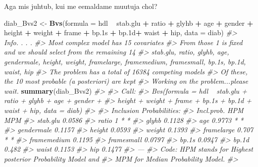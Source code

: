 \documentclass[]{book}
\newenvironment{Shaded}{\begin{snugshade}}{\end{snugshade}}
\newcommand{\KeywordTok}[1]{\textcolor[rgb]{0.13,0.29,0.53}{\textbf{#1}}}
\newcommand{\DataTypeTok}[1]{\textcolor[rgb]{0.13,0.29,0.53}{#1}}
\newcommand{\StringTok}[1]{\textcolor[rgb]{0.31,0.60,0.02}{#1}}
\newcommand{\CommentTok}[1]{\textcolor[rgb]{0.56,0.35,0.01}{\textit{#1}}}
\newcommand{\OperatorTok}[1]{\textcolor[rgb]{0.81,0.36,0.00}{\textbf{#1}}}
\newcommand{\NormalTok}[1]{#1}
\begin{document}
Aga mis juhtub, kui me eemaldame muutuja chol?

\begin{Shaded}
\begin{Highlighting}[]
\NormalTok{diab_Bvs2 <-}\StringTok{ }\KeywordTok{Bvs}\NormalTok{(}\DataTypeTok{formula =}\NormalTok{ hdl }\OperatorTok{~}\StringTok{ }\NormalTok{stab.glu }\OperatorTok{+}\StringTok{ }\NormalTok{ratio }\OperatorTok{+}\StringTok{ }\NormalTok{glyhb }\OperatorTok{+}\StringTok{ }\NormalTok{age }\OperatorTok{+}\StringTok{ }\NormalTok{gender }\OperatorTok{+}\StringTok{ }\NormalTok{height }\OperatorTok{+}\StringTok{ }\NormalTok{weight }\OperatorTok{+}\StringTok{ }\NormalTok{frame }\OperatorTok{+}\StringTok{ }\NormalTok{bp.1s }\OperatorTok{+}\StringTok{ }\NormalTok{bp.1d}\OperatorTok{+}\StringTok{ }\NormalTok{waist }\OperatorTok{+}\StringTok{ }\NormalTok{hip, }\DataTypeTok{data =}\NormalTok{ diab)}
\CommentTok{#> Info. . . .}
\CommentTok{#> Most complex model has 15 covariates}
\CommentTok{#> From those 1 is fixed and we should select from the remaining 14 }
\CommentTok{#> stab.glu, ratio, glyhb, age, gendermale, height, weight, framelarge, framemedium, framesmall, bp.1s, bp.1d, waist, hip}
\CommentTok{#> The problem has a total of 16384 competing models}
\CommentTok{#> Of these, the  10 most probable (a posteriori) are kept}
\CommentTok{#> Working on the problem...please wait.}
\KeywordTok{summary}\NormalTok{(diab_Bvs2)}
\CommentTok{#> }
\CommentTok{#> Call:}
\CommentTok{#> Bvs(formula = hdl ~ stab.glu + ratio + glyhb + age + gender + }
\CommentTok{#>     height + weight + frame + bp.1s + bp.1d + waist + hip, data = diab)}
\CommentTok{#> }
\CommentTok{#> Inclusion Probabilities:}
\CommentTok{#>             Incl.prob. HPM MPM}
\CommentTok{#> stab.glu        0.0586        }
\CommentTok{#> ratio                1   *   *}
\CommentTok{#> glyhb           0.1128        }
\CommentTok{#> age             0.9773   *   *}
\CommentTok{#> gendermale      0.1157        }
\CommentTok{#> height          0.0593        }
\CommentTok{#> weight          0.1393        }
\CommentTok{#> framelarge       0.707   *   *}
\CommentTok{#> framemedium     0.1195        }
\CommentTok{#> framesmall      0.0797        }
\CommentTok{#> bp.1s           0.0947        }
\CommentTok{#> bp.1d            0.482        }
\CommentTok{#> waist           0.1153        }
\CommentTok{#> hip             0.1477        }
\CommentTok{#> ---}
\CommentTok{#> Code: HPM stands for Highest posterior Probability Model and}
\CommentTok{#>  MPM for Median Probability Model.}
\CommentTok{#> }
\end{Highlighting}
\end{Shaded}
\end{document}
